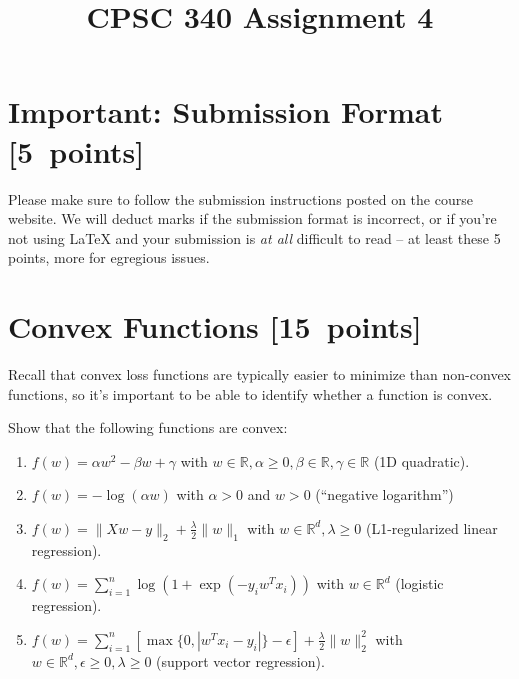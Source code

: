 \documentclass{article}
\newcommand{\blu}[1]{{\textcolor{blu}{#1}}}
\let\ask\blu
\newcommand\pts[1]{\textcolor{pointscolour}{[#1~points]}}
\def\R{\mathbb{R}}
\newcommand{\norm}[1]{\lVert #1 \rVert}
\begin{document}
\title{CPSC 340 Assignment 4}
\date{}
\maketitle

\vspace{-4em}

\section*{Important: Submission Format \pts{5}}

    Please make sure to follow the submission instructions posted on the course website.
    \ask{We will deduct marks if the submission format is incorrect, or if you're not using \LaTeX{} and your submission is \emph{at all} difficult to read} -- at least these 5 points, more for egregious issues.

\section{Convex Functions \pts{15}}

Recall that convex loss functions are typically easier to minimize than non-convex functions, so it's important to be able to identify whether a function is convex.

\ask{Show that the following functions are convex}:

\begin{enumerate}
\item $f(w) = \alpha w^2 - \beta w + \gamma$ with $w \in \R, \alpha \geq 0, \beta \in \R, \gamma \in \R$ (1D quadratic).

\item $f(w) = -\log(\alpha w) $ with $\alpha > 0$ and $w > 0$ (``negative logarithm'')

\item $f(w) = \norm{Xw-y}_2 + \frac{\lambda}{2}\norm{w}_1$ with $w \in \R^d, \lambda \geq 0$ (L1-regularized linear regression).

\item $f(w) = \sum_{i=1}^n \log(1+\exp(-y_iw^Tx_i)) $ with $w \in \R^d$ (logistic regression).

\item $f(w) = \sum_{i=1}^n[\max\{0,|w^Tx_i - y_i|\} - \epsilon] + \frac{\lambda}{2}\norm{w}_2^2$  with $w \in \R^d, \epsilon \geq 0, \lambda \geq 0$ (support vector regression).

\end{enumerate}
\end{document}

